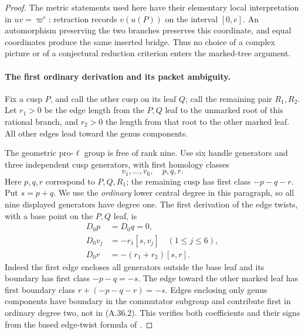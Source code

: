 \begin{proof}
The metric statements used here have their elementary
local interpretation in \(uv=\varpi^e\): retraction
records \(v(u(P))\) on the interval \([0,e]\).
An automorphism preserving the two branches preserves
this coordinate, and equal coordinates produce the
same inserted bridge. Thus no choice of a complex
picture or of a conjectural reduction criterion
enters the marked-tree argument.

\paragraph{The first ordinary derivation and its packet ambiguity.}
Fix a cusp \(P\), and call the other cusp on its leaf
\(Q\); call the remaining pair \(R_1,R_2\).
Let \(r_1>0\) be the edge length from the \(P,Q\) leaf
to the unmarked root of this rational branch, and
\(r_2>0\) the length from that root to the other marked
leaf. All other edges lead toward the genus components.

The geometric pro-\(\ell\) group is free of rank nine.
Use six handle generators and three independent cusp
generators, with first homology classes
\[
         v_1,\ldots,v_6,\quad p,q,r.
\]
Here \(p,q,r\) correspond to \(P,Q,R_1\); the remaining
cusp has first class \(-p-q-r\). Put \(s=p+q\).
We use the \emph{ordinary} lower central degree in this
paragraph, so all nine displayed generators have degree
one. The first derivation of the edge twists, with a
base point on the \(P,Q\) leaf, is
\[
 \begin{split}
 D_0p&=D_0q=0,\\
 D_0v_j&=-r_1[s,v_j]\quad(1\le j\le6),\\
 D_0r&=-(r_1+r_2)[s,r].
 \end{split}                                             \tag{A.36.2}
\]
Indeed the first edge encloses all generators outside
the base leaf and its boundary has first class
\(-p-q=-s\). The edge toward the other marked leaf
has first boundary class \(r+(-p-q-r)=-s\).
Edges enclosing only genus components have boundary
in the commutator subgroup and contribute first in
ordinary degree two, not in (A.36.2). This verifies both
coefficients and their signs from the based edge-twist
formula of \cite[Definition 3.1.5 and Theorem 3.1.6]{fghBettsDogra}.


\end{proof}
